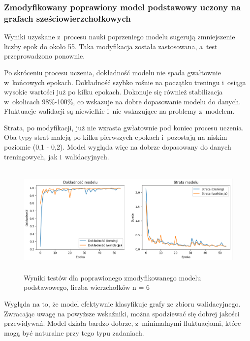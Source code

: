 
\subsubsection{Zmodyfikowany poprawiony model podstawowy uczony na grafach sześciowierzchołkowych}

Wyniki uzyskane z~procesu nauki poprzeniego modelu sugerują zmniejszenie liczby epok do około 55.
Taka modyfikacja została zastosowana, a~test przeprowadzono ponownie.

Po skróceniu procesu uczenia, dokładność modelu nie spada gwałtownie w~końcowych epokach.
Dokładność szybko rośnie na początku treningu i~osiąga wysokie wartości już po kilku epokach.
Dokonuje się również stabilizacja w~okolicach 98\%-100\%, co wskazuje na dobre dopasowanie modelu do danych.
Fluktuacje walidacji są niewielkie i~nie wskazujące na problemy z~modelem.

Strata, po modyfikacji, już nie wzrasta gwłatownie pod koniec procesu uczenia.
Oba typy strat maleją po kilku pierwszych epokach i~pozostają na niskim poziomie (0,1 - 0,2).
Model wygląda więc na dobrze dopasowany do danych treningowych, jak i~walidacyjnych.

\begin{figure}[ht]
	\centering
	\includegraphics[height=5.5cm]{resources/tests/images/v4/base6_1_1_img.png}
	\caption{Wyniki testów dla poprawionego zmodyfikowanego modelu podstawowego, liczba wierzchołków n = 6}
	\label{Fig:tests-best-1a}
\end{figure}
\FloatBarrier

Wygląda na to, że model efektywnie klasyfikuje grafy ze zbioru walidacyjnego.
Zwracając uwagę na powyższe wskaźniki, można spodziewać się dobrej jakości przewidywań.
Model działa bardzo dobrze, z~minimalnymi fluktuacjami, które mogą być naturalne przy tego typu zadaniach.

